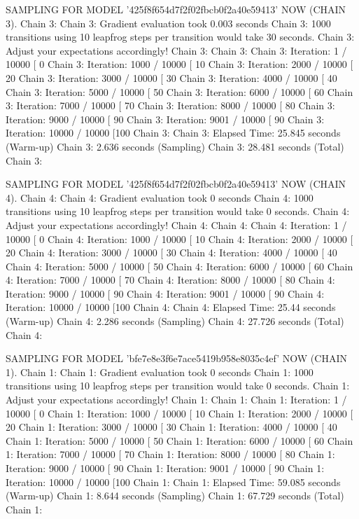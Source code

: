\documentclass[
]{jss}
\begin{document}
\begin{CodeChunk}
\begin{CodeOutput}
SAMPLING FOR MODEL '425f8f654d7f2f02fbcb0f2a40e59413' NOW (CHAIN 3).
Chain 3: 
Chain 3: Gradient evaluation took 0.003 seconds
Chain 3: 1000 transitions using 10 leapfrog steps per transition would take 30 seconds.
Chain 3: Adjust your expectations accordingly!
Chain 3: 
Chain 3: 
Chain 3: Iteration:    1 / 10000 [  0%
Chain 3: Iteration: 1000 / 10000 [ 10%
Chain 3: Iteration: 2000 / 10000 [ 20%
Chain 3: Iteration: 3000 / 10000 [ 30%
Chain 3: Iteration: 4000 / 10000 [ 40%
Chain 3: Iteration: 5000 / 10000 [ 50%
Chain 3: Iteration: 6000 / 10000 [ 60%
Chain 3: Iteration: 7000 / 10000 [ 70%
Chain 3: Iteration: 8000 / 10000 [ 80%
Chain 3: Iteration: 9000 / 10000 [ 90%
Chain 3: Iteration: 9001 / 10000 [ 90%
Chain 3: Iteration: 10000 / 10000 [100%
Chain 3: 
Chain 3:  Elapsed Time: 25.845 seconds (Warm-up)
Chain 3:                2.636 seconds (Sampling)
Chain 3:                28.481 seconds (Total)
Chain 3: 

SAMPLING FOR MODEL '425f8f654d7f2f02fbcb0f2a40e59413' NOW (CHAIN 4).
Chain 4: 
Chain 4: Gradient evaluation took 0 seconds
Chain 4: 1000 transitions using 10 leapfrog steps per transition would take 0 seconds.
Chain 4: Adjust your expectations accordingly!
Chain 4: 
Chain 4: 
Chain 4: Iteration:    1 / 10000 [  0%
Chain 4: Iteration: 1000 / 10000 [ 10%
Chain 4: Iteration: 2000 / 10000 [ 20%
Chain 4: Iteration: 3000 / 10000 [ 30%
Chain 4: Iteration: 4000 / 10000 [ 40%
Chain 4: Iteration: 5000 / 10000 [ 50%
Chain 4: Iteration: 6000 / 10000 [ 60%
Chain 4: Iteration: 7000 / 10000 [ 70%
Chain 4: Iteration: 8000 / 10000 [ 80%
Chain 4: Iteration: 9000 / 10000 [ 90%
Chain 4: Iteration: 9001 / 10000 [ 90%
Chain 4: Iteration: 10000 / 10000 [100%
Chain 4: 
Chain 4:  Elapsed Time: 25.44 seconds (Warm-up)
Chain 4:                2.286 seconds (Sampling)
Chain 4:                27.726 seconds (Total)
Chain 4: 

SAMPLING FOR MODEL 'bfe7e8e3f6e7ace5419b958e8035c4ef' NOW (CHAIN 1).
Chain 1: 
Chain 1: Gradient evaluation took 0 seconds
Chain 1: 1000 transitions using 10 leapfrog steps per transition would take 0 seconds.
Chain 1: Adjust your expectations accordingly!
Chain 1: 
Chain 1: 
Chain 1: Iteration:    1 / 10000 [  0%
Chain 1: Iteration: 1000 / 10000 [ 10%
Chain 1: Iteration: 2000 / 10000 [ 20%
Chain 1: Iteration: 3000 / 10000 [ 30%
Chain 1: Iteration: 4000 / 10000 [ 40%
Chain 1: Iteration: 5000 / 10000 [ 50%
Chain 1: Iteration: 6000 / 10000 [ 60%
Chain 1: Iteration: 7000 / 10000 [ 70%
Chain 1: Iteration: 8000 / 10000 [ 80%
Chain 1: Iteration: 9000 / 10000 [ 90%
Chain 1: Iteration: 9001 / 10000 [ 90%
Chain 1: Iteration: 10000 / 10000 [100%
Chain 1: 
Chain 1:  Elapsed Time: 59.085 seconds (Warm-up)
Chain 1:                8.644 seconds (Sampling)
Chain 1:                67.729 seconds (Total)
Chain 1: 


\end{CodeOutput}
\end{CodeChunk}
\end{document}
